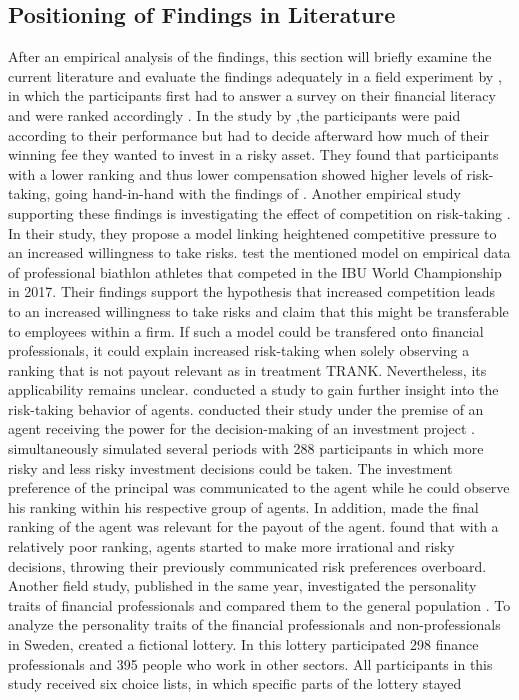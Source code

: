 \documentclass[12pt]{article}
\begin{document}
\subsection{Positioning of Findings in Literature} \label{subsection:positioning}
After an empirical analysis of the findings, this section will briefly examine the current literature and evaluate the findings adequately in a field experiment by \textcite{Krull2024}, in which the participants first had to answer a survey on their financial literacy and were ranked accordingly \parencite[p.~4]{Krull2024}. In the study by \textcite[p.~4]{Krull2024},the participants were paid according to their performance but had to decide afterward how much of their winning fee they wanted to invest in a risky asset. They found that participants with a lower ranking and thus lower compensation showed higher levels of risk-taking, going hand-in-hand with the findings of \textcite{Kirchler2018} \parencite[p.~12]{Krull2024}. Another empirical study supporting these findings is investigating the effect of competition on risk-taking \parencite{Gürtler2023}.  In their study, they propose a model linking heightened competitive pressure to an increased willingness to take risks. \textcite[p.~8]{Gürtler2023} test the mentioned model on empirical data of professional biathlon athletes that competed in the IBU World Championship in 2017. Their findings support the hypothesis that increased competition leads to an increased willingness to take risks and claim that this might be transferable to employees within a firm. If such a model could be transfered onto financial professionals, it could explain increased risk-taking when solely observing a ranking that is not payout relevant as in treatment TRANK. Nevertheless, its applicability remains unclear. \textcite{Gillenkirch2018} conducted a study to gain further insight into the risk-taking behavior of agents. \textcite[p.~17]{Gillenkirch2018} conducted their study under the premise of an agent receiving the power for the decision-making of an investment project \parencite[p.~5]{Gillenkirch2018}. \textcite[pp.~5-17]{Gillenkirch2018} simultaneously simulated several periods with 288 participants in which more risky and less risky investment decisions could be taken. The investment preference of the principal was communicated to the agent while he could observe his ranking within his respective group of agents. In addition, \textcite[p.~5]{Gillenkirch2018} made the final ranking of the agent was relevant for the payout of the agent. \textcite[p.~26]{Gillenkirch2018} found that with a relatively poor ranking, agents started to make more irrational and risky decisions, throwing their previously communicated risk preferences overboard. Another field study, published in the same year, investigated the personality traits of financial professionals and compared them to the general population \parencite{Holmen2023}. To analyze the personality traits of the financial professionals and non-professionals in Sweden, \textcite{Holmen2023} created a fictional lottery. In this lottery participated 298 ﬁnance professionals and 395 people who work in other sectors. All participants in this study received six choice lists, in which specific parts of the lottery stayed 
\end{document}

